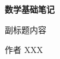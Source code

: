 \begin{titlepage}
    \centering

    \vspace*{5cm} %
    {\Huge \bfseries 数学基础笔记\par}  %
    \vspace{1em}

    {\LARGE 副标题内容\par}  %
    \vfill %
    {\large 作者 XXX\par}  %
\end{titlepage}